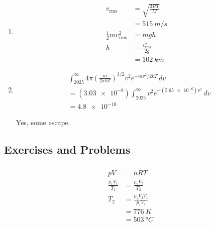 \documentclass{article}
\begin{document}
\subsubsection{}

\begin{enumerate}
  \item

        \begin{align*}
          v_\text{rms}                 & = \sqrt{\frac{3 R T}{M}}     \\
                                       & = \qty{515}{m/s}             \\
          \frac{1}{2} m v_\text{rms}^2 & = m g h                      \\
          h                            & = \frac{v_\text{rms}^2}{2 g} \\
                                       & = \qty{102}{km}
        \end{align*}

  \item

        \begin{align*}
           & \int_{2025}^\infty 4 \pi \left( \frac{m}{2 \pi k T} \right)^{3 / 2} v^2 e^{-m v^2 / 2 k T} \,d v \\
           & = (\num{3.03e-8}) \int_{2025}^\infty v^2 e^{-(\num{5.65e-6}) v^2} \,d v                          \\
           & = \num{4.8e-10}
        \end{align*}

        Yes, some escape.
\end{enumerate}

\subsection{Exercises and Problems}

\setcounter{subsubsection}{6}
\subsubsection{}

\begin{align*}
  p V                 & = n R T                       \\
  \frac{p_1 V_1}{T_1} & = \frac{p_2 V_2}{T_2}         \\
  T_2                 & = \frac{p_2 V_2 T_1}{p_1 V_1} \\
                      & = \qty{776}{K}                \\
                      & = \qty{503}{\degree C}
\end{align*}
\end{document}
